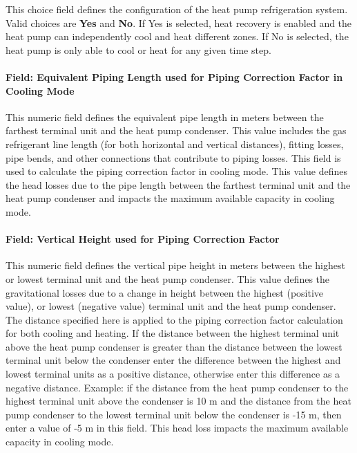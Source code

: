 This choice field defines the configuration of the heat pump refrigeration system. Valid choices are \textbf{Yes} and \textbf{No}. If Yes is selected, heat recovery is enabled and the heat pump can independently cool and heat different zones. If No is selected, the heat pump is only able to cool or heat for any given time step.

\paragraph{Field: Equivalent Piping Length used for Piping Correction Factor in Cooling Mode}\label{field-equivalent-piping-length-used-for-piping-correction-factor-in-cooling-mode}

This numeric field defines the equivalent pipe length in meters between the farthest terminal unit and the heat pump condenser. This value includes the gas refrigerant line length (for both horizontal and vertical distances), fitting losses, pipe bends, and other connections that contribute to piping losses. This field is used to calculate the piping correction factor in cooling mode. This value defines the head losses due to the pipe length between the farthest terminal unit and the heat pump condenser and impacts the maximum available capacity in cooling mode.

\paragraph{Field: Vertical Height used for Piping Correction Factor}\label{field-vertical-height-used-for-piping-correction-factor}

This numeric field defines the vertical pipe height in meters between the highest or lowest terminal unit and the heat pump condenser. This value defines the gravitational losses due to a change in height between the highest (positive value), or lowest (negative value) terminal unit and the heat pump condenser. The distance specified here is applied to the piping correction factor calculation for both cooling and heating. If the distance between the highest terminal unit above the heat pump condenser is greater than the distance between the lowest terminal unit below the condenser enter the difference between the highest and lowest terminal units as a positive distance, otherwise enter this difference as a negative distance. Example: if the distance from the heat pump condenser to the highest terminal unit above the condenser is 10 m and the distance from the heat pump condenser to the lowest terminal unit below the condenser is -15 m, then enter a value of -5 m in this field. This head loss impacts the maximum available capacity in cooling mode.

